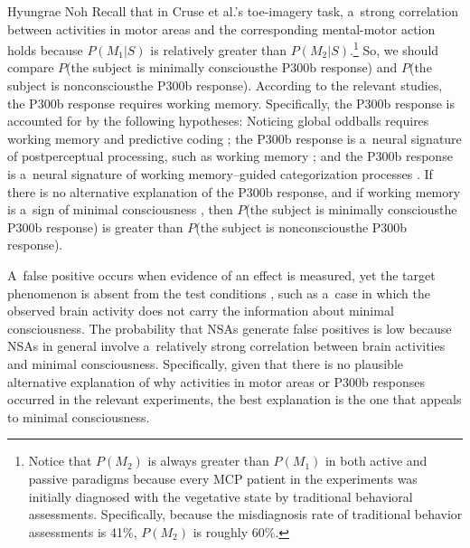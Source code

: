 \begin{artengenv}{Hyungrae Noh}
Recall that in Cruse et al.'s
\parencite*[][]{cruse_bedside_2011} %
 toe-imagery task, a~strong correlation between activities in motor areas and the corresponding mental-motor action holds because $P(M_1 | S)$ is relatively greater than $P(M_2 | S)$.\footnote{Notice that $P(M_2)$ is always greater than $P(M_1)$ in both active and passive paradigms because every MCP patient in the experiments was initially diagnosed with the vegetative state by traditional behavioral assessments. Specifically, because the misdiagnosis rate of traditional behavior assessments is 41\%, $P(M_2)$ is roughly 60\%.} So, we should compare $P$(the subject is minimally conscious{\textbar}the P300b response) and $P$(the subject is nonconscious{\textbar}the P300b response). According to the relevant studies, the P300b response requires working memory. Specifically, the P300b response is accounted for by the following hypotheses: Noticing global oddballs requires working memory and predictive coding 
\parencites[][]{garrido_functional_2008}[][]{garrido_repetition_2009}; %
 the P300b response is a~neural signature of postperceptual processing, such as working memory 
\parencite[][]{cohen_distinguishing_2020}; %
 and the P300b response is a~neural signature of working memory–guided categorization processes 
\parencite[][]{rac-lubashevsky_revisiting_2019}. %
 If there is no alternative explanation of the P300b response, and if working memory is a~sign of minimal consciousness 
\parencites[][]{ansell_slow--recover_1993}[][]{bekinschtein_neural_2009}[][]{king_single-trial_2013}, %
 then $P$(the subject is minimally conscious{\textbar}the P300b response) is greater than $P$(the subject is nonconscious{\textbar}the P300b response).

A~false positive occurs when evidence of an effect is measured, yet the target phenomenon is absent from the test conditions
\parencite[][p.591]{peterson_risk_2015}, %
 such as a~case in which the observed brain activity does not carry the information about minimal consciousness. The probability that NSAs generate false positives is low because NSAs in general involve a~relatively strong correlation between brain activities and minimal consciousness. Specifically, given that there is no plausible alternative explanation of why activities in motor areas or P300b responses occurred in the relevant experiments, the best explanation is the one that appeals to minimal consciousness.


\end{artengenv}
